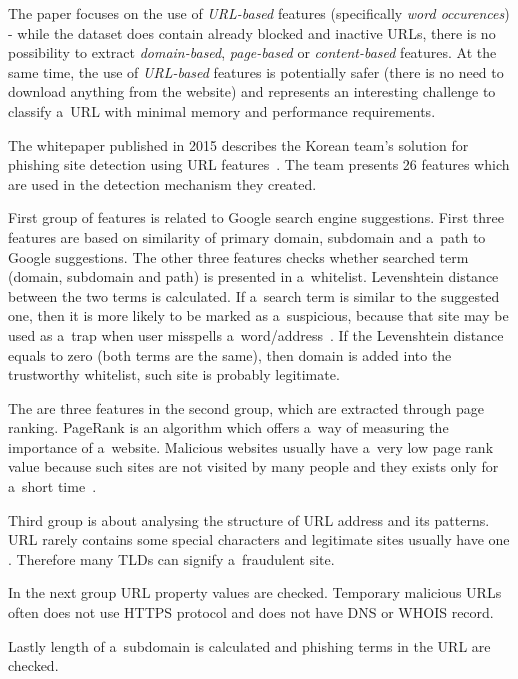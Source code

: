 The paper focuses on the use of \textit{URL-based} features (specifically \textit{word occurences}) - while the dataset does contain already blocked and inactive URLs, there is no possibility to extract \textit{domain-based}, \textit{page-based} or \textit{content-based} features.
At the same time, the use of \textit{URL-based} features is potentially safer (there is no need to download anything from the website) and represents an interesting challenge to classify a~URL with minimal memory and performance requirements.

The whitepaper  published in 2015 describes the Korean team's solution for phishing site detection using URL features~\cite{Lee2015HeuristicbasedAF}.
The team presents 26 features which are used in the detection mechanism they created.

First group of features is related to Google search engine suggestions.
First three features are based on similarity of primary domain, subdomain and a~path to Google suggestions.
The other three features checks whether searched term (domain, subdomain and path) is presented in a~whitelist.
Levenshtein distance between the two terms is calculated.
If a~search term is similar to the suggested one, then it is more likely to be marked as a~suspicious, because that site may be used as a~trap when user misspells a~word/address~\cite{Lee2015HeuristicbasedAF}.
If the Levenshtein distance equals to zero (both terms are the same), then domain is added into the trustworthy whitelist, such site is probably legitimate.

The are three features in the second group, which are extracted through page ranking.
PageRank is an algorithm which offers a~way of measuring the importance of a~website.
Malicious websites usually have a~very low page rank value because such sites are not visited by many people and they exists only for a~short time~\cite{Lee2015HeuristicbasedAF}.

Third group is about analysing the structure of URL address and its patterns.
URL rarely contains some special characters and legitimate sites usually have one .
Therefore many TLDs can signify a~fraudulent site.

In the next group URL property values are checked.
Temporary malicious URLs often does not use HTTPS protocol and does not have DNS or WHOIS record.

Lastly length of a~subdomain is calculated and phishing terms in the URL are checked.

